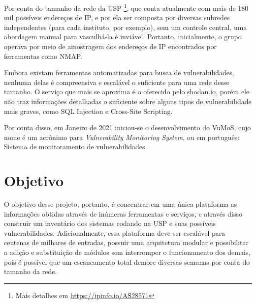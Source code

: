 Por conta do tamanho da rede da USP \footnote{Mais detalhes em \url{https://ipinfo.io/AS28571}}, 
que conta atualmente com mais de 180 mil possíveis endereços de IP,  e por ela ser composta por diversas subredes independentes (para cada instituto, por exemplo), sem um controle central, uma abordagem manual para vasculhá-la é inviável. Portanto, inicialmente, o grupo operava por meio de amostragem dos endereços de IP encontrados por ferramentas como NMAP. 


Embora existam ferramentas automatizadas para busca de vulnerabilidades, nenhuma delas é compreensiva e escalável o suficiente para uma rede desse tamanho. O serviço que mais se aproxima é o oferecido pelo 
\url{shodan.io},
porém ele não traz informações detalhadas o suficiente sobre alguns tipos de vulnerabilidade mais graves, como 
SQL Injection e Cross-Site Scripting. 

Por conta disso, em Janeiro de 2021 iniciou-se o desenvolvimento do VuMoS, cujo nome é um acrônimo para \textit{Vulnerability Monitoring System}, ou em português: Sistema de monitoramento de vulnerabilidades.



\section{Objetivo}

O objetivo desse projeto, portanto, é concentrar em uma única plataforma as informações obtidas através de inúmeras ferramentas e serviços, e através disso construir um inventário dos sistemas rodando na USP e suas possíveis vulnerabilidades. Adicionalmente, essa plataforma deve ser escalável para centenas de milhares de entradas, possuir uma arquitetura modular e possibilitar a adição e substituição de módulos sem interromper o funcionamento dos demais, pois é possível que um escaneamento total demore diversas semanas por conta do tamanho da rede. 